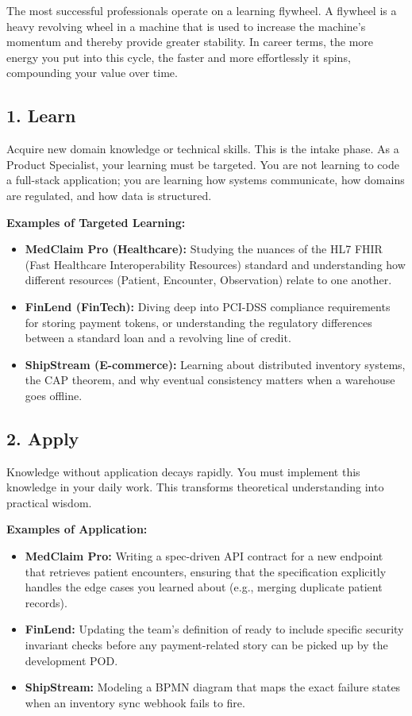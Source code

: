 \documentclass[
  11pt,
  openany,
  oneside]{book}
\providecommand{\tightlist}{%
  \setlength{\itemsep}{0pt}\setlength{\parskip}{0pt}}
\begin{document}
The most successful professionals operate on a learning flywheel. A
flywheel is a heavy revolving wheel in a machine that is used to
increase the machine's momentum and thereby provide greater stability.
In career terms, the more energy you put into this cycle, the faster and
more effortlessly it spins, compounding your value over time.

\subsection{1. Learn}\label{learn}

Acquire new domain knowledge or technical skills. This is the intake
phase. As a Product Specialist, your learning must be targeted. You are
not learning to code a full-stack application; you are learning how
systems communicate, how domains are regulated, and how data is
structured.

\textbf{Examples of Targeted Learning:}

\begin{itemize}
\tightlist
\item
  \textbf{MedClaim Pro (Healthcare):} Studying the nuances of the HL7
  FHIR (Fast Healthcare Interoperability Resources) standard and
  understanding how different resources (Patient, Encounter,
  Observation) relate to one another.
\item
  \textbf{FinLend (FinTech):} Diving deep into PCI-DSS compliance
  requirements for storing payment tokens, or understanding the
  regulatory differences between a standard loan and a revolving line of
  credit.
\item
  \textbf{ShipStream (E-commerce):} Learning about distributed inventory
  systems, the CAP theorem, and why eventual consistency matters when a
  warehouse goes offline.
\end{itemize}

\subsection{2. Apply}\label{apply}

Knowledge without application decays rapidly. You must implement this
knowledge in your daily work. This transforms theoretical understanding
into practical wisdom.

\textbf{Examples of Application:}

\begin{itemize}
\tightlist
\item
  \textbf{MedClaim Pro:} Writing a spec-driven API contract for a new
  endpoint that retrieves patient encounters, ensuring that the
  specification explicitly handles the edge cases you learned about
  (e.g., merging duplicate patient records).
\item
  \textbf{FinLend:} Updating the team's definition of ready to include
  specific security invariant checks before any payment-related story
  can be picked up by the development POD.
\item
  \textbf{ShipStream:} Modeling a BPMN diagram that maps the exact
  failure states when an inventory sync webhook fails to fire.
\end{itemize}
\end{document}
